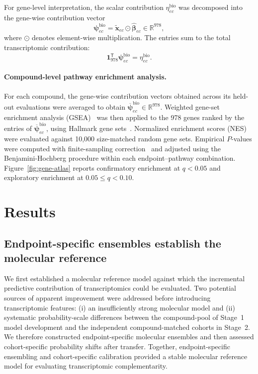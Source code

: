 \documentclass[11pt,a4paper]{article}
\begin{document}
For gene-level interpretation, the scalar contribution
\(\eta^{\mathrm{bio}}_{ec}\) was decomposed into the gene-wise contribution
vector
\begin{equation}
\boldsymbol{\psi}^{\mathrm{bio}}_{ec}
=
\widetilde{\mathbf x}_{ec}
\odot
\widehat{\boldsymbol\beta}_{ec}
\in\mathbb R^{978},
\label{eq:gene-wise-transcriptomic-contribution}
\end{equation}
where \(\odot\) denotes element-wise multiplication. The entries sum to the total transcriptomic contribution:
\begin{equation}
\mathbf 1_{978}^{\mathsf T}
\boldsymbol{\psi}^{\mathrm{bio}}_{ec}
=
\eta^{\mathrm{bio}}_{ec}.
\label{eq:sum-gene-contributions}
\end{equation}

\paragraph{Compound-level pathway enrichment analysis.}
For each compound, the gene-wise contribution vectors obtained across its
held-out evaluations were averaged to obtain
\(\overline{\boldsymbol{\psi}}^{\mathrm{bio}}_{ec}\in\mathbb R^{978}\).
Weighted gene-set enrichment analysis (GSEA)~\cite{subramanian2005gsea}
was then applied to the 978 genes ranked by the
entries of
\(\overline{\boldsymbol{\psi}}^{\mathrm{bio}}_{ec}\), using Hallmark gene sets~\cite{liberzon2015hallmark}.
Normalized enrichment scores (NES) were evaluated
against 10,000 size-matched random gene sets. Empirical \(P\)-values were
computed with finite-sampling correction~\cite{phipson2010permutation}
and adjusted using the Benjamini-Hochberg
procedure within each endpoint--pathway combination. Figure~\ref{fig:gene-atlas}
reports confirmatory enrichment at \(q<0.05\) and exploratory enrichment at
\(0.05\leq q<0.10\).

\section{Results}

\subsection{Endpoint-specific ensembles establish the molecular reference}

We first established a molecular reference model against which the incremental
predictive contribution of transcriptomics could be evaluated. Two potential
sources of apparent improvement were addressed before introducing
transcriptomic features: (i) an insufficiently strong molecular model and (ii)
systematic probability-scale differences between the compound-pool of Stage~1 model development and the independent compound-matched cohorts in Stage~2. We therefore constructed endpoint-specific molecular ensembles and then assessed cohort-specific probability shifts after transfer. Together, endpoint-specific ensembling and cohort-specific calibration provided a stable molecular reference model for evaluating transcriptomic complementarity.
\end{document}
